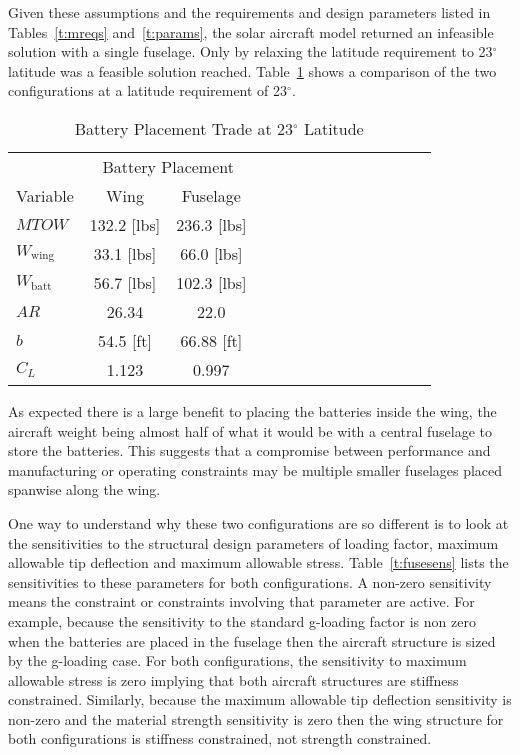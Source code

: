 \documentclass[]{aiaa-tc}%
\begin{document}
Given these assumptions and the requirements and design parameters listed in Tables~\ref{t:mreqs} and~\ref{t:params}, the solar aircraft model returned an infeasible solution with a single fuselage. Only by relaxing the latitude requirement to 23$^{\circ}$ latitude was a feasible solution reached.  Table~\ref{t:fuse} shows a comparison of the two configurations at a latitude requirement of 23$^{\circ}$. 

\begin{longtable}{lccccccccccccc}
    \caption{Battery Placement Trade at 23$^{\circ}$ Latitude}\\
    \toprule
    \toprule
    \label{t:fuse}
                            & \multicolumn{2}{c}{Battery Placement} \\
    Variable                & Wing          &  Fuselage     \\ \hline
    $MTOW$                  & 132.2 [lbs]   & 236.3 [lbs]   \\
    $W_{\mathrm{wing}}$     & 33.1 [lbs]    & 66.0 [lbs]    \\
    $W_{\mathrm{batt}}$     & 56.7 [lbs]    & 102.3 [lbs]   \\
    $AR$                    & 26.34         & 22.0          \\
    $b$                     & 54.5 [ft]     &  66.88 [ft]   \\
    $C_L$                   & 1.123         &  0.997        \\
    \bottomrule
\end{longtable}

As expected there is a large benefit to placing the batteries inside the wing, the aircraft weight being almost half of what it would be with a central fuselage to store the batteries.  
This suggests that a compromise between performance and manufacturing or operating constraints may be multiple smaller fuselages placed spanwise along the wing.  

One way to understand why these two configurations are so different is to look at the sensitivities to the structural design parameters of loading factor, maximum allowable tip deflection and maximum allowable stress. 
Table~\ref{t:fusesens} lists the sensitivities to these parameters for both configurations. 
A non-zero sensitivity means the constraint or constraints involving that parameter are active.  
For example, because the sensitivity to the standard g-loading factor is non zero when the batteries are placed in the fuselage then the aircraft structure is sized by the g-loading case.  
For both configurations, the sensitivity to maximum allowable stress is zero implying that both aircraft structures are stiffness constrained. 
Similarly, because the maximum allowable tip deflection sensitivity is non-zero and the material strength sensitivity is zero then the wing structure for both configurations is stiffness constrained, not strength constrained. 
\end{document}
